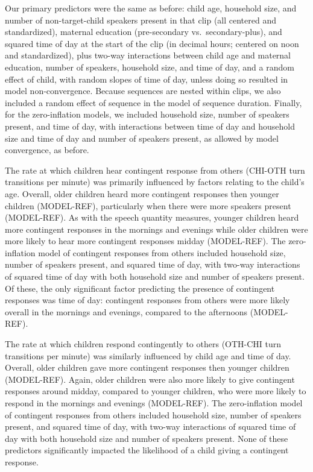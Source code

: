 \documentclass[floatsintext,man]{apa6}
\theoremstyle{definition}
\theoremstyle{definition}
\theoremstyle{definition}
\theoremstyle{remark}
\begin{document}
Our primary predictors were the same as before: child age, household
size, and number of non-target-child speakers present in that clip (all
centered and standardized), maternal education (pre-secondary
vs.~secondary-plus), and squared time of day at the start of the clip
(in decimal hours; centered on noon and standardized), plus two-way
interactions between child age and maternal education, number of
speakers, household size, and time of day, and a random effect of child,
with random slopes of time of day, unless doing so resulted in model
non-convergence. Because sequences are nested within clips, we also
included a random effect of sequence in the model of sequence duration.
Finally, for the zero-inflation models, we included household size,
number of speakers present, and time of day, with interactions between
time of day and household size and time of day and number of speakers
present, as allowed by model convergence, as before.

The rate at which children hear contingent response from others (CHI-OTH
turn transitions per minute) was primarily influenced by factors
relating to the child's age. Overall, older children heard more
contingent responses then younger children (MODEL-REF), particularly
when there were more speakers present (MODEL-REF). As with the speech
quantity measures, younger children heard more contingent responses in
the mornings and evenings while older children were more likely to hear
more contingent responses midday (MODEL-REF). The zero-inflation model
of contingent responses from others included household size, number of
speakers present, and squared time of day, with two-way interactions of
squared time of day with both household size and number of speakers
present. Of these, the only significant factor predicting the presence
of contingent responses was time of day: contingent responses from
others were more likely overall in the mornings and evenings, compared
to the afternoons (MODEL-REF).

The rate at which children respond contingently to others (OTH-CHI turn
transitions per minute) was similarly influenced by child age and time
of day. Overall, older children gave more contingent responses then
younger children (MODEL-REF). Again, older children were also more
likely to give contingent responses around midday, compared to younger
children, who were more likely to respond in the mornings and evenings
(MODEL-REF). The zero-inflation model of contingent responses from
others included household size, number of speakers present, and squared
time of day, with two-way interactions of squared time of day with both
household size and number of speakers present. None of these predictors
significantly impacted the likelihood of a child giving a contingent
response.
\end{document}
